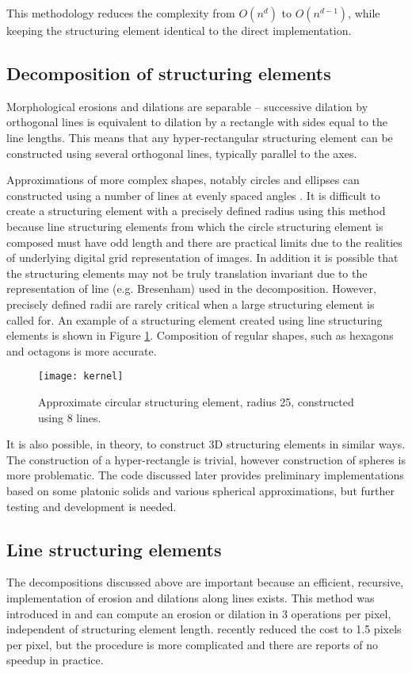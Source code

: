 \documentclass{InsightArticle}
\begin{document}
This methodology reduces the complexity from $O(n^d)$ to $O(n^{d-1})$,
while keeping the structuring element identical to the direct
implementation.

\subsection{Decomposition of structuring elements}
\label{sect:MMdecomp}
Morphological erosions and dilations are separable -- successive
dilation by orthogonal lines is equivalent to dilation by a rectangle
with sides equal to the line lengths. This means that any
hyper-rectangular structuring element can be constructed using several
orthogonal lines, typically parallel to the axes.

Approximations of more complex shapes, notably circles and
ellipses can constructed using a number of lines at evenly spaced
angles \cite{Adams93}. It is difficult to create a structuring element
with a precisely defined radius using this method because line
structuring elements from which the circle structuring element is
composed must have odd length and there are practical limits due to
the realities of underlying digital grid representation of images. In
addition it is possible that the structuring elements may not be truly
translation invariant due to the representation of line
(e.g. Bresenham) used in the decomposition. However, precisely defined
radii are rarely critical when a large structuring element is called
for. An example of a structuring element created using line
structuring elements is shown in Figure
\ref{fig:circledecomposition}. Composition of regular shapes, such as
hexagons and octagons is more accurate.

\begin{figure}[htbp]
\centering
\texttt{[image: kernel]}
\caption{Approximate circular structuring element, radius 25, constructed using 8 lines.\label{fig:circledecomposition}}
\end{figure}

It is also possible, in theory, to construct 3D structuring elements
in similar ways. The construction of a hyper-rectangle is trivial,
however construction of spheres is more problematic. The code
discussed later provides preliminary implementations based on some
platonic solids and various spherical approximations, but further
testing and development is needed.

\subsection{Line structuring elements}
The decompositions discussed above are important because an efficient,
recursive, implementation of erosion and dilations along lines
exists. This method was introduced in \cite{Gil1993,vanHerk1992a} and
can compute an erosion or dilation in 3 operations per pixel,
independent of structuring element length. \cite{Gil2000} recently
reduced the cost to 1.5 pixels per pixel, but the procedure is more
complicated and there are reports of no speedup in practice.
\end{document}
